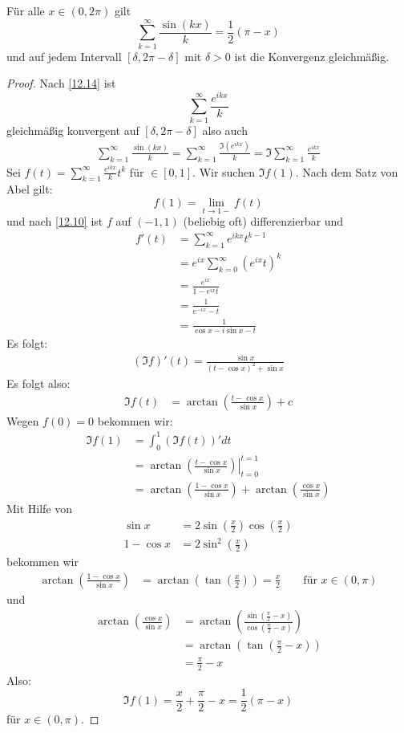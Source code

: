 \documentclass{mycourse}
\begin{document}
\begin{st}
\label{12.15}
Für alle $x\in(0,2\pi)$ gilt
\[
\sum_{k=1}^\infty \frac{\sin(kx)}k = \frac 12 (\pi-x)
\]
und auf jedem Intervall $[\delta,2\pi-\delta]$ mit $\delta>0$ ist die Konvergenz gleichmäßig.

\begin{proof}
Nach \ref{12.14} ist
\[
\sum_{k=1}^\infty \frac {e^{ikx}}k
\]
gleichmäßig konvergent auf $[\delta, 2\pi-\delta]$ also auch
\begin{align*}
\sum_{k=1}^\infty \frac{\sin(kx)}k
= \sum_{k=1}^\infty \frac {\Im(e^{ikx})}k
=\Im \sum_{k=1}^\infty \frac{e^{ikx}}k
\end{align*}
Sei $f(t) = \sum_{k=1}^\infty \frac{e^{ikx}}k t^k$ für $\in[0,1]$.
Wir suchen $\Im f(1)$.
Nach dem Satz von Abel gilt:
\[
f(1)=\lim_{t\to 1-}f(t)
\]
und nach \ref{12.10} ist $f$ auf $(-1,1)$ (beliebig oft) differenzierbar und
\begin{align*}
f'(t) 
&= \sum_{k=1}^\infty e^{ikx}t^{k-1}\\
&= e^{ix}\sum_{k=0}^\infty (e^{ix}t)^k\\
&= \frac {e^{ix}}{1-e^{ix}t}\\
&= \frac 1{e^{-ix}-t}\\
&= \frac 1{\cos x -i\sin x -t}
\end{align*}
Es folgt:
\begin{align*}
(\Im f)'(t)=\frac {\sin x}{(t-\cos x)^2 +\sin x}
\end{align*}
Es folgt also:
\begin{align*}
\Im f(t)
&= \arctan \left(\frac {t-\cos x}{\sin x}\right) + c
\end{align*}
Wegen $f(0)=0$ bekommen wir:
\begin{align*}
\Im f(1)
&= \int_0^1(\Im f(t))'dt\\
&= \left.\arctan\left( \frac {t-\cos x}{\sin x}\right)\right|_{t=0}^{t=1}\\
&= \arctan \left(\frac {1-\cos x}{\sin x}\right) +\arctan\left(\frac {\cos x}{\sin x}\right)
\end{align*}
Mit Hilfe von
\begin{align*}
\sin x &= 2\sin\left(\frac x2\right)\cos\left(\frac x2\right)\\
1-\cos x &= 2\sin^2\left(\frac x2\right)
\end{align*}
bekommen wir
\begin{align*}
\arctan\left(\frac {1-\cos x}{\sin x}\right)
&= \arctan\left(\tan\left(\frac x2\right)\right)
= \frac x2 \qquad \text{für } x\in (0,\pi)
\end{align*}
und
\begin{align*}
\arctan\left(\frac{\cos x}{\sin x}\right)
&= \arctan\left(\frac{\sin(\frac \pi2-x)}{\cos(\frac \pi2-x)}\right) \\
&= \arctan\left(\tan\left(\frac \pi 2-x\right)\right)\\
&= \frac \pi 2 -x
\end{align*}
Also:
\[
\Im f(1) = \frac x2 +\frac \pi 2- x= \frac 12 (\pi -x)
\]
für $x\in (0,\pi)$.
\end{proof}
\end{st}
\end{document}
